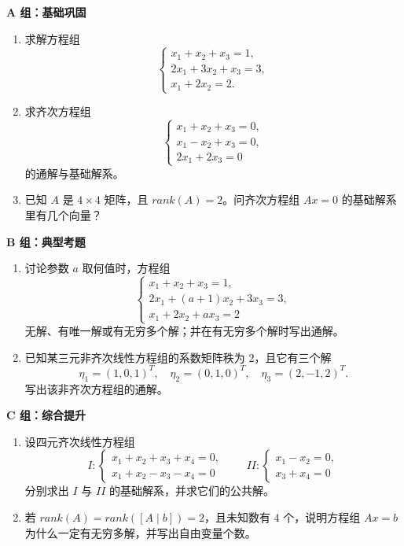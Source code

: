 \documentclass[11pt,oneside,UTF8]{ctexbook}
\begin{document}
\begin{exercisebox}[第 1 章分级习题]
\textbf{A 组：基础巩固}
\begin{enumerate}[label=\textbf{A\arabic*.}]
  \item 求解方程组
  \[
  \begin{cases}
  x_1+x_2+x_3=1,\\
  2x_1+3x_2+x_3=3,\\
  x_1+2x_2=2.
  \end{cases}
  \]
  \item 求齐次方程组
  \[
  \begin{cases}
  x_1+x_2+x_3=0,\\
  x_1-x_2+x_3=0,\\
  2x_1+2x_3=0
  \end{cases}
  \]
  的通解与基础解系。
  \item 已知 \(A\) 是 \(4\times 4\) 矩阵，且 \(rank(A)=2\)。问齐次方程组 \(Ax=0\) 的基础解系里有几个向量？
\end{enumerate}

\textbf{B 组：典型考题}
\begin{enumerate}[label=\textbf{B\arabic*.}]
  \item 讨论参数 \(a\) 取何值时，方程组
  \[
  \begin{cases}
  x_1+x_2+x_3=1,\\
  2x_1+(a+1)x_2+3x_3=3,\\
  x_1+2x_2+a x_3=2
  \end{cases}
  \]
  无解、有唯一解或有无穷多个解；并在有无穷多个解时写出通解。
  \item 已知某三元非齐次线性方程组的系数矩阵秩为 \(2\)，且它有三个解
  \[
  \eta_1=(1,0,1)^T,\quad
  \eta_2=(0,1,0)^T,\quad
  \eta_3=(2,-1,2)^T.
  \]
  写出该非齐次方程组的通解。
\end{enumerate}

\textbf{C 组：综合提升}
\begin{enumerate}[label=\textbf{C\arabic*.}]
  \item 设四元齐次线性方程组
  \[
  I:\begin{cases}
  x_1+x_2+x_3+x_4=0,\\
  x_1+x_2-x_3-x_4=0
  \end{cases}
  \qquad
  II:\begin{cases}
  x_1-x_2=0,\\
  x_3+x_4=0
  \end{cases}
  \]
  分别求出 \(I\) 与 \(II\) 的基础解系，并求它们的公共解。
  \item 若 \(rank(A)=rank([A\mid b])=2\)，且未知数有 \(4\) 个，说明方程组 \(Ax=b\) 为什么一定有无穷多解，并写出自由变量个数。
\end{enumerate}
\end{exercisebox}
\end{document}
